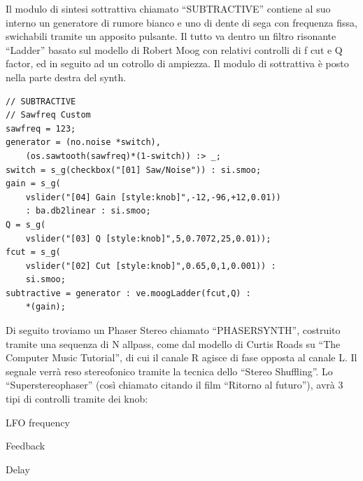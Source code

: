 \documentclass[
	a4paper,
	twocolumn
	]{article}
\begin{document}
Il modulo di sintesi sottrattiva chiamato “SUBTRACTIVE” contiene al suo interno un generatore di rumore bianco e uno di dente di sega con frequenza fissa, swichabili tramite un apposito pulsante. Il tutto va dentro un filtro risonante “Ladder” basato sul modello di Robert Moog con relativi controlli di f cut e Q factor, ed in seguito ad un cotrollo di ampiezza.
Il modulo di sottrattiva è posto nella parte destra del synth.


\begin{lstlisting}
// SUBTRACTIVE
// Sawfreq Custom
sawfreq = 123;
generator = (no.noise *switch),
	(os.sawtooth(sawfreq)*(1-switch)) :> _;
switch = s_g(checkbox("[01] Saw/Noise")) : si.smoo;
gain = s_g(
	vslider("[04] Gain [style:knob]",-12,-96,+12,0.01))
	: ba.db2linear : si.smoo;
Q = s_g(
	vslider("[03] Q [style:knob]",5,0.7072,25,0.01));
fcut = s_g(
	vslider("[02] Cut [style:knob]",0.65,0,1,0.001)) :
	si.smoo;
subtractive = generator : ve.moogLadder(fcut,Q) :
	*(gain);
\end{lstlisting}


Di seguito troviamo un Phaser Stereo chiamato “PHASERSYNTH”, costruito tramite una sequenza di N allpass, come dal modello di Curtis Roads su “The Computer Music Tutorial”, di cui il canale R agisce di fase opposta al canale L. Il segnale verrà reso stereofonico tramite la tecnica dello “Stereo Shuffling”. Lo “Superstereophaser” (così chiamato citando il film “Ritorno al futuro”), avrà 3 tipi di controlli tramite dei knob:
\begin{compactitem}
\item LFO frequency
\item Feedback
\item Delay
\end{compactitem}
\end{document}
